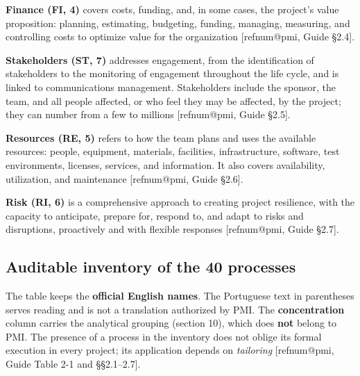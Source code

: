 \documentclass[12pt,a4paper,article,oneside,brazil,english]{abntex2}
\makeatletter
\newcommand{\refnum}[1]{\csname refnum@#1\endcsname}
\makeatother
\begin{document}
\textbf{Finance (FI, 4)} covers costs, funding, and, in some cases, the project's value proposition: planning, estimating, budgeting, funding, managing, measuring, and controlling costs to optimize value for the organization [\refnum{pmi}, Guide §2.4].

\textbf{Stakeholders (ST, 7)} addresses engagement, from the identification of stakeholders to the monitoring of engagement throughout the life cycle, and is linked to communications management. Stakeholders include the sponsor, the team, and all people affected, or who feel they may be affected, by the project; they can number from a few to millions [\refnum{pmi}, Guide §2.5].

\textbf{Resources (RE, 5)} refers to how the team plans and uses the available resources: people, equipment, materials, facilities, infrastructure, software, test environments, licenses, services, and information. It also covers availability, utilization, and maintenance [\refnum{pmi}, Guide §2.6].

\textbf{Risk (RI, 6)} is a comprehensive approach to creating project resilience, with the capacity to anticipate, prepare for, respond to, and adapt to risks and disruptions, proactively and with flexible responses [\refnum{pmi}, Guide §2.7].
\subsection{Auditable inventory of the 40 processes}

The table keeps the \textbf{official English names}. The Portuguese text in parentheses serves reading and is not a translation authorized by PMI. The \textbf{concentration} column carries the analytical grouping (section 10), which does \textbf{not} belong to PMI. The presence of a process in the inventory does not oblige its formal execution in every project; its application depends on \textit{tailoring} [\refnum{pmi}, Guide Table 2-1 and §§2.1–2.7].
\end{document}
